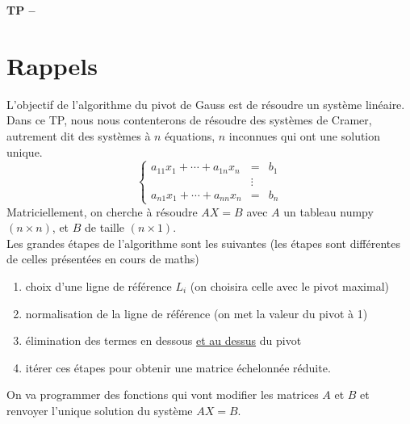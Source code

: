 






\begin{center}
{\Large\bf TP \no {\numero} -- \descrip}
\end{center}


\section{Rappels}
\noindent L'objectif de l'algorithme du pivot de Gauss est de r\' esoudre un syst\` eme lin\' eaire. Dans ce TP, nous nous contenterons de r\' esoudre des syst\` emes de Cramer, autrement dit des syst\` emes \` a $n$ \' equations, $n$ inconnues qui ont une solution unique.\\
\[\left\lbrace \begin{array}{ccc}
a_{11}x_1+\cdots +a_{1n}x_n & =&b_1\\
&\vdots&\\
a_{n1}x_1+\cdots +a_{nn}x_n & =&b_n
\end{array}\right.\]
Matriciellement, on cherche \` a r\' esoudre $AX=B$ avec $A$ un tableau numpy $(n\times n)$, et $B$ de taille $(n\times 1)$.\\
Les grandes \' etapes de l'algorithme sont les suivantes (les \' etapes sont diff\' erentes de celles pr\' esent\' ees en cours de maths)
\begin{enumerate}
\item choix d'une ligne de r\' ef\' erence $L_i$ (on choisira celle avec le pivot maximal)
\item normalisation de la ligne de r\' ef\' erence (on met la valeur du pivot \` a 1)
\item \' elimination des termes en dessous \underline{et au dessus} du pivot
\item it\' erer ces \' etapes pour obtenir une matrice \' echelonn\' ee r\' eduite.
\end{enumerate}


\noindent On va programmer des fonctions qui vont modifier les matrices $A$ et $B$ et renvoyer l'unique solution du syst\` eme $AX=B$. 
 
